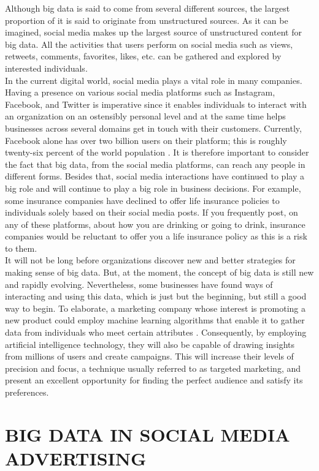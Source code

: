 \documentclass[sigconf]{acmart}
\begin{document}
Although big data is said to come from several different sources, the largest proportion of it is said to originate from unstructured sources. As it can be imagined, social media makes up the largest source of unstructured content for big data. All the activities that users perform on social media such as views, retweets, comments, favorites, likes, etc. can be gathered and explored by interested individuals. \\
In the current digital world, social media plays a vital role in many companies. Having a presence on various social media platforms such as Instagram, Facebook, and Twitter is imperative since it enables individuals to interact with an organization on an ostensibly personal level and at the same time helps businesses across several domains get in touch with their customers. Currently, Facebook alone has over two billion users on their platform; this is roughly twenty-six percent of the world population \cite{Geer2017}. It is therefore important to consider the fact that big data, from the social media platforms, can reach any people in different forms. Besides that, social media interactions have continued to play a big role and will continue to play a big role in business decisions. For example, some insurance companies have declined to offer life insurance policies to individuals solely based on their social media posts. If you frequently post, on any of these platforms, about how you are drinking or going to drink, insurance companies would be reluctant to offer you a life insurance policy as this is a risk to them. \\
It will not be long before organizations discover new and better strategies for making sense of big data. But, at the moment, the concept of big data is still new and rapidly evolving. Nevertheless, some businesses have found ways of interacting and using this data, which is just but the beginning, but still a good way to begin. To elaborate, a marketing company whose interest is promoting a new product could employ machine learning algorithms that enable it to gather data from individuals who meet certain attributes \cite{Geer2017}. Consequently, by employing artificial intelligence technology, they will also be capable of drawing insights from millions of users and create campaigns. This will increase their levels of precision and focus, a technique usually referred to as targeted marketing, and present an excellent opportunity for finding the perfect audience and satisfy its preferences. 

\section{BIG DATA IN SOCIAL MEDIA ADVERTISING}
\end{document}
